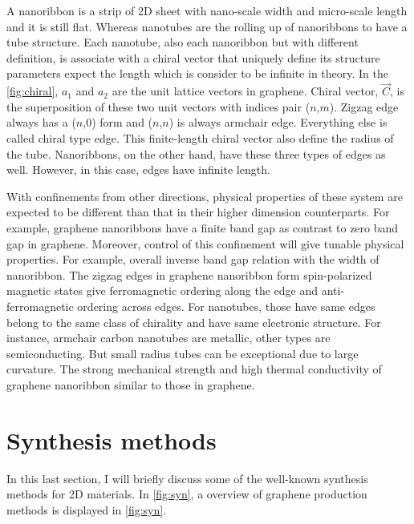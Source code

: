 A nanoribbon is a strip of 2D sheet with nano-scale width and micro-scale length and it is still flat. Whereas nanotubes are the rolling up of nanoribbons to have a tube structure. Each nanotube, also each nanoribbon but with different definition, is associate with a chiral vector that uniquely define its structure parameters expect the length which is consider to be infinite in theory. In the \autoref{fig:chiral}, $a_1$ and $a_2$ are the unit lattice vectors in graphene.  Chiral vector, $\vec{C}$, is the superposition of these two unit vectors with indices pair ($n$,$m$). Zigzag edge always has a ($n$,0) form and ($n$,$n$) is always armchair edge. Everything else is called chiral type edge.  This finite-length chiral vector also define the radius of the tube. Nanoribbons, on the other hand, have these three types of edges as well. However, in this case, edges have infinite length. 

With confinements from other directions, physical properties of these system are expected to be different than that in their higher dimension counterparts. For example, graphene nanoribbons have a finite band gap as contrast to zero band gap in graphene\cite{Wang2008}. Moreover, control of this confinement will give tunable physical properties. For example, overall inverse band gap relation with the width of nanoribbon\cite{Han2007}. The zigzag edges in graphene nanoribbon form spin-polarized magnetic states give ferromagnetic ordering along the edge and anti-ferromagnetic ordering across edges\cite{Son2006}. For nanotubes, those have same edges belong to the same class of chirality and have same electronic structure. For instance, armchair carbon nanotubes are metallic, other types are semiconducting. But small radius tubes can be exceptional due to large curvature\cite{Bandaru2007}.  The strong mechanical strength and high thermal conductivity of graphene nanoribbon similar to those in graphene.

\section{Synthesis methods}

In this last section, I will briefly discuss some of the well-known synthesis methods for 2D materials. In \autoref{fig:syn}, a overview of graphene production methods is displayed in \autoref{fig:syn}. 

